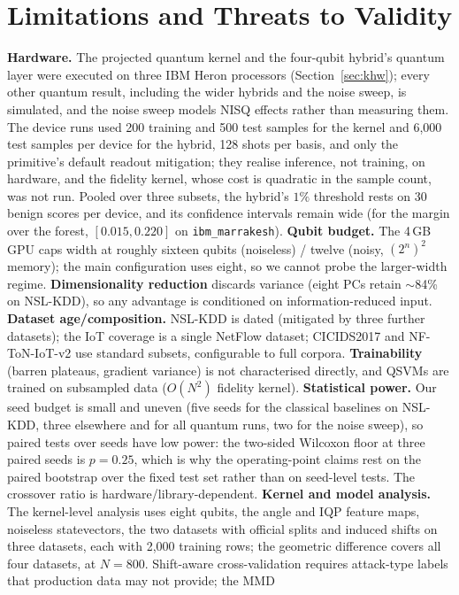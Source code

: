 \documentclass[preprint,11pt]{elsarticle}
\begin{document}
\section{Limitations and Threats to Validity}
\textbf{Hardware.} The projected quantum kernel and the four-qubit hybrid's quantum layer were executed
on three IBM Heron processors (Section~\ref{sec:khw}); every other quantum result, including the wider
hybrids and the noise sweep, is simulated, and the noise sweep models NISQ effects rather than measuring
them. The device runs used 200 training and 500 test samples for the kernel and 6{,}000 test samples per
device for the hybrid, 128 shots per basis, and only the primitive's default readout mitigation; they
realise inference, not training, on hardware, and the fidelity kernel, whose cost is quadratic in the
sample count, was not run. Pooled over three subsets, the hybrid's $1\%$ threshold rests on 30 benign
scores per device, and its confidence intervals remain wide (for the margin over the forest,
$[0.015,0.220]$ on \texttt{ibm\_marrakesh}).
\textbf{Qubit budget.} The 4\,GB GPU caps width at roughly sixteen qubits (noiseless) / twelve (noisy,
$(2^n)^2$ memory); the main configuration uses eight, so we cannot probe the larger-width regime.
\textbf{Dimensionality reduction} discards variance (eight PCs retain $\sim$84\% on NSL-KDD), so any
advantage is conditioned on information-reduced input.
\textbf{Dataset age/composition.} NSL-KDD is dated (mitigated by three further datasets); the IoT coverage
is a single NetFlow dataset; CICIDS2017 and NF-ToN-IoT-v2 use standard subsets, configurable to full
corpora.
\textbf{Trainability} (barren plateaus, gradient variance) is not characterised directly, and QSVMs are
trained on subsampled data ($O(N^2)$ fidelity kernel).
\textbf{Statistical power.} Our seed budget is small and uneven (five seeds for the classical baselines
on NSL-KDD, three elsewhere and for all quantum runs, two for the noise sweep), so paired tests over
seeds have low power: the two-sided Wilcoxon floor at three paired seeds is $p=0.25$, which is why the
operating-point claims rest on the paired bootstrap over the fixed test set rather than on seed-level
tests. The crossover ratio is hardware/library-dependent.
\textbf{Kernel and model analysis.} The kernel-level analysis uses eight qubits, the angle and IQP
feature maps, noiseless statevectors, the two datasets with official splits and induced shifts on three
datasets, each with 2{,}000 training rows; the geometric difference covers all four datasets, at $N=800$.
Shift-aware cross-validation requires attack-type labels that production data may not provide; the MMD
\end{document}
